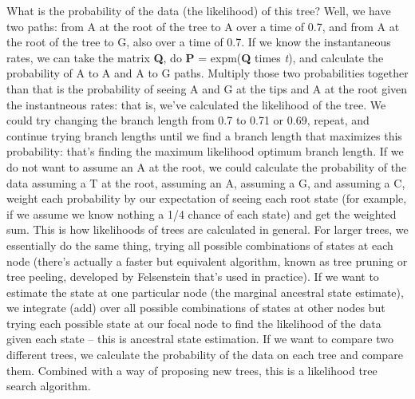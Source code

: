 \documentclass[
]{article}
\begin{document}
What is the probability of the data (the likelihood) of this tree? Well, we have two paths: from A at the root of the tree to A over a time of 0.7, and from A at the root of the tree to G, also over a time of 0.7. If we know the instantaneous rates, we can take the matrix \textbf{Q}, do \textbf{P} = expm(\textbf{Q} times \emph{t}), and calculate the probability of A to A and A to G paths. Multiply those two probabilities together than that is the probability of seeing A and G at the tips and A at the root given the instantneous rates: that is, we've calculated the likelihood of the tree. We could try changing the branch length from 0.7 to 0.71 or 0.69, repeat, and continue trying branch lengths until we find a branch length that maximizes this probability: that's finding the maximum likelihood optimum branch length. If we do not want to assume an A at the root, we could calculate the probability of the data assuming a T at the root, assuming an A, assuming a G, and assuming a C, weight each probability by our expectation of seeing each root state (for example, if we assume we know nothing a 1/4 chance of each state) and get the weighted sum. This is how likelihoods of trees are calculated in general. For larger trees, we essentially do the same thing, trying all possible combinations of states at each node (there's actually a faster but equivalent algorithm, known as tree pruning or tree peeling, developed by Felsenstein that's used in practice). If we want to estimate the state at one particular node (the marginal ancestral state estimate), we integrate (add) over all possible combinations of states at other nodes but trying each possible state at our focal node to find the likelihood of the data given each state -- this is ancestral state estimation. If we want to compare two different trees, we calculate the probability of the data on each tree and compare them. Combined with a way of proposing new trees, this is a likelihood tree search algorithm.
\end{document}

